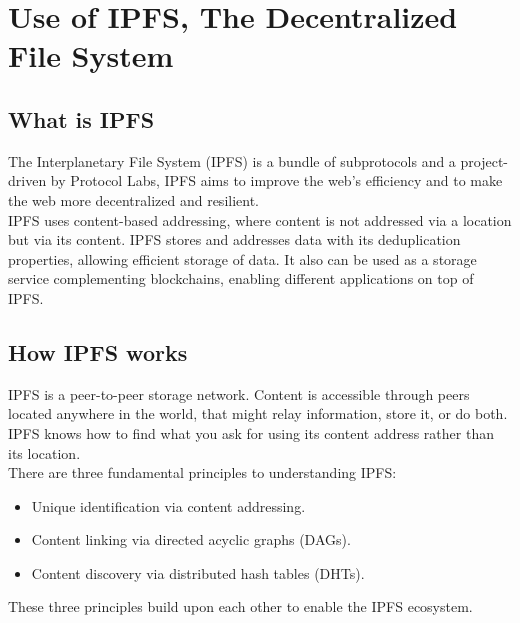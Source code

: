 
\section{Use of IPFS, The Decentralized File System}

\subsection{What is IPFS}

The Interplanetary File System (IPFS) is a bundle of subprotocols and a project-driven by Protocol Labs, IPFS aims to improve the web’s efficiency and to make the web more decentralized and resilient. \\[-8pt]

IPFS uses content-based addressing, where content is not addressed via a location but via its content. IPFS stores and addresses data with its deduplication properties, allowing efficient storage of data. It also can be used as a storage service complementing blockchains, enabling different applications on top of IPFS. \\[-8pt]

\subsection{How IPFS works}

IPFS is a peer-to-peer storage network. Content is accessible through peers located anywhere in the world, that might relay information, store it, or do both. IPFS knows how to find what you ask for using its content address rather than its location. \\[-8pt]

\noindent
There are three fundamental principles to understanding IPFS: \\

\begin{itemize}
\item Unique identification via content addressing.
\item Content linking via directed acyclic graphs (DAGs).
\item Content discovery via distributed hash tables (DHTs).
\end{itemize}

These three principles build upon each other to enable the IPFS ecosystem.